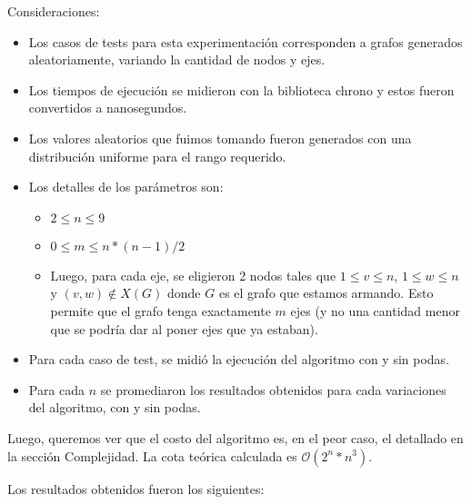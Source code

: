 Consideraciones:
\begin{itemize}
    \item Los casos de tests para esta experimentación corresponden a grafos generados aleatoriamente, variando la cantidad de nodos y ejes.
    \item Los tiempos de ejecución se midieron con la biblioteca chrono y estos fueron convertidos a nanosegundos.
    \item Los valores aleatorios que fuimos tomando fueron generados con una distribución uniforme para el rango requerido.
    \item Los detalles de los parámetros son:
        \begin{itemize}
            \item $2 \leq n \leq 9$
            \item $0 \leq m \leq n*(n-1)/2$
            \item Luego, para cada eje, se eligieron 2 nodos tales que $1 \leq v \leq n$, $1 \leq w \leq n$ y $(v,w) \notin X(G)$ donde $G$ es el grafo que estamos armando. Esto permite que el grafo tenga exactamente $m$ ejes (y no una cantidad menor que se podría dar al poner ejes que ya estaban).
        \end{itemize}
    \item Para cada caso de test, se midió la ejecución del algoritmo con y sin podas.
    \item Para cada $n$ se promediaron los resultados obtenidos para cada variaciones del algoritmo, con y sin podas.
\end{itemize}

Luego, queremos ver que el costo del algoritmo es, en el peor caso, el detallado en la sección Complejidad. La cota teórica calculada es $\mathcal{O}(2^n*n^3)$.

Los resultados obtenidos fueron los siguientes:

